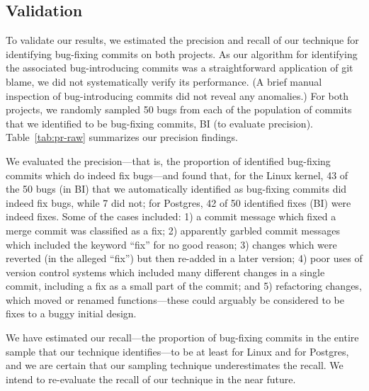 
\subsection{Validation} 
To validate our results, we estimated the precision and recall of our
technique for identifying bug-fixing commits on both projects.  As our
algorithm for identifying the associated bug-introducing commits was a
straightforward application of git blame, we did not systematically
verify its performance. (A brief manual inspection of bug-introducing
commits did not reveal any anomalies.) 
For both projects, we randomly sampled 50 bugs
from each of the population of commits that we identified to be
bug-fixing commits, BI (to evaluate precision).
Table~\ref{tab:pr-raw} summarizes our precision findings.

We evaluated the precision---that is, the proportion of identified
bug-fixing commits which do indeed fix bugs---and found that, for
the Linux kernel, 43 of the 50 bugs (in BI) that we automatically identified as
bug-fixing commits did indeed fix bugs, while 7 did not; for Postgres,
42 of 50 identified fixes (BI) were indeed fixes.  Some of the
cases included: 1) a commit message which fixed a merge commit was
classified as a fix; 2) apparently garbled commit messages which
included the keyword ``fix'' for no good reason; 3) changes which were
reverted (in the alleged ``fix'') but then re-added in a later
version; 4) poor uses of version control systems which included many
different changes in a single commit, including a fix as a small part 
of the commit; and 5) refactoring changes, which moved or renamed
functions---these could arguably be considered to be fixes to a buggy
initial design.

We have estimated our recall---the proportion of bug-fixing commits in
the entire sample that our technique identifies---to be at least \linuxR for
Linux and \postR for Postgres, and we are certain that our sampling
technique underestimates the recall. We intend to re-evaluate the
recall of our technique in the near future.

